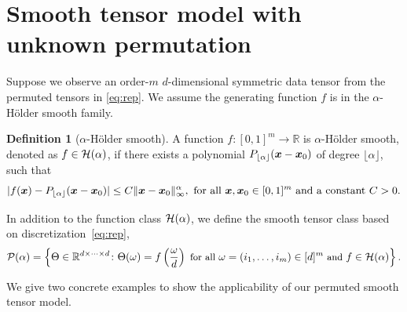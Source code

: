 \documentclass{article}
\theoremstyle{definition}
\newtheorem{defn}{Definition}
\begin{document}
\section{Smooth tensor model with unknown permutation}\label{sec:md}
\vspace{-.3cm}
Suppose we observe an order-$m$ $d$-dimensional symmetric data tensor from the permuted  tensors in \eqref{eq:rep}.
We assume the generating function $f$ is in the $\alpha$-H\"older smooth family. 
\begin{defn}[$\alpha$-H\"older smooth]
A function $f\colon [0,1]^m\rightarrow \mathbb{R}$ is $\alpha$-H\"older smooth, denoted as $f\in\mathcal{H}(\alpha)$, if there exists a polynomial $P_{\lfloor \alpha\rfloor}(\bm x-\bm x_0)$ of degree  $\lfloor \alpha\rfloor$, such that 
\begin{align}\label{eq:defn}
    |f(\bm x) - P_{\lfloor \alpha\rfloor}(\bm x-\bm x_0)| \leq C\|\bm x-\bm x_0\|_\infty^\alpha, \text{ for all $\bm x,\bm x_0\in [0,1]^m$ and a constant $C>0.$}
\end{align}

\end{defn}
In addition to the function class $\mathcal{H}(\alpha)$, we define the smooth tensor class based on discretization~\eqref{eq:rep}, 
\[
{\small \tP(\alpha)= \left\{\Theta\in\mathbb{R}^{d\times \cdots \times d} \colon\Theta(\omega) = f\left({\omega \over d}\right) \text{ for all } \omega=(i_1,\ldots,i_m) \in[d]^m \text{ and } f\in\tH(\alpha)\right\}.}
\]


We give two concrete examples to show the applicability of our permuted smooth tensor model. 
\end{document}
